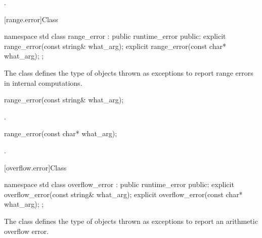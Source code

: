 \begin{itemdescr}
\pnum
{}

\pnum
\ensures
{}.
\end{itemdescr}

[range.error]{Class }

%
\begin{codeblock}
namespace std {
  class range_error : public runtime_error {
  public:
    explicit range_error(const string& what_arg);
    explicit range_error(const char* what_arg);
  };
}
\end{codeblock}

\pnum
The class
defines the type of objects thrown as exceptions to report range errors
in internal computations.

%
\begin{itemdecl}
range_error(const string& what_arg);
\end{itemdecl}

\begin{itemdescr}
\pnum
{}

\pnum
\ensures
{}.
\end{itemdescr}

%
\begin{itemdecl}
range_error(const char* what_arg);
\end{itemdecl}

\begin{itemdescr}
\pnum
{}

\pnum
\ensures
{}.
\end{itemdescr}

[overflow.error]{Class }

%
\begin{codeblock}
namespace std {
  class overflow_error : public runtime_error {
  public:
    explicit overflow_error(const string& what_arg);
    explicit overflow_error(const char* what_arg);
  };
}
\end{codeblock}

\pnum
The class
defines the type of objects thrown as exceptions to report an arithmetic overflow error.

